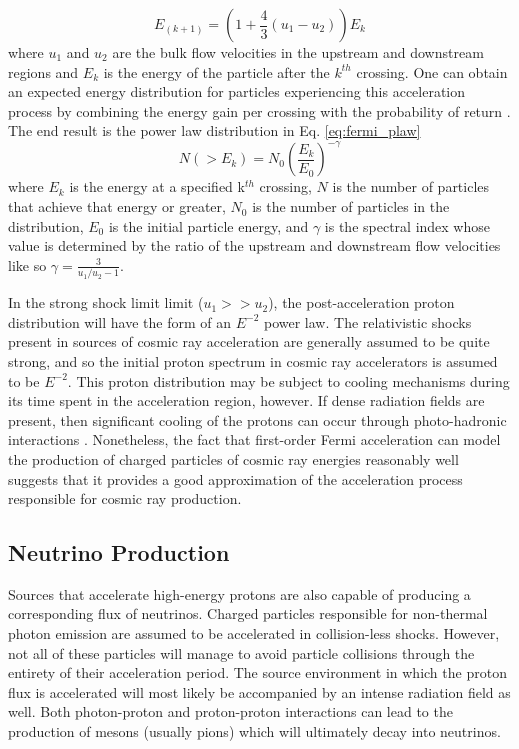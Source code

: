 \documentclass{gatech-thesis}
\begin{document}
\begin{equation}\label{eq:shock_the_monkey}
E_{(k+1)} = \left(1 + \frac{4}{3}(u_1 - u_2) \right) E_k
\end{equation}
where $u_1$ and $u_2$ are the bulk flow velocities in the upstream and downstream regions and $E_k$ is the energy of the particle after the $k^{th}$ crossing. One can obtain an expected energy distribution for particles experiencing this acceleration process by combining the energy gain per crossing with the probability of return \cite{ParticleAcceleration}. The end result is the power law distribution in Eq. \ref{eq:fermi_plaw}
\begin{equation}\label{eq:fermi_plaw}
N(>E_k) = N_0 \left(\frac{E_k}{E_0}\right)^{-\gamma}
\end{equation}
where $E_k$ is the energy at a specified k$^{th}$ crossing, $N$ is the number of particles that achieve that energy or greater, $N_0$ is the number of particles in the distribution, $E_0$ is the initial particle energy, and $\gamma$ is the spectral index whose value is determined by the ratio of the upstream and downstream flow velocities like so $\gamma = \frac{3}{u_1/u_2-1}$.

In the strong shock limit limit ($u_1 >> u_2$), the  post-acceleration proton distribution will have the form of an $E^{-2}$ power law. The relativistic shocks present in sources of cosmic ray acceleration are generally assumed to be quite strong, and so the initial proton spectrum in cosmic ray accelerators is assumed to be $E^{-2}$. This proton distribution may be subject to cooling mechanisms during its time spent in the acceleration region, however. If dense radiation fields are present, then significant cooling of the protons can occur through photo-hadronic interactions \cite{1984ARA&A..22..425H}. Nonetheless, the fact that first-order Fermi acceleration can model the production of charged particles of cosmic ray energies reasonably well suggests that it provides a good approximation of the acceleration process responsible for cosmic ray production.

\subsection{Neutrino Production}
Sources that accelerate high-energy protons are also capable of producing a corresponding flux of neutrinos. Charged particles responsible for non-thermal photon emission are assumed to be accelerated in collision-less shocks. However, not all of these particles will manage to avoid particle collisions through the entirety of their acceleration period. The source environment in which the proton flux is accelerated will most likely be accompanied by an intense radiation field as well. Both photon-proton and proton-proton interactions can lead to the production of mesons (usually pions) which will ultimately decay into neutrinos.
\end{document}
